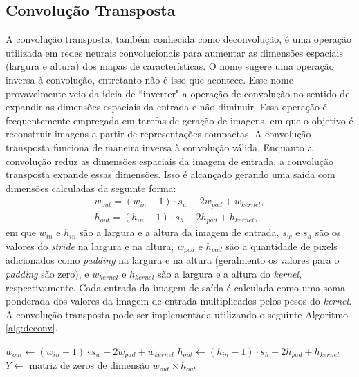 \subsection{Convolução Transposta}
\label{sec:conv_transposta}
A convolução transposta, também conhecida como deconvolução, é uma operação utilizada em redes neurais convolucionais para aumentar as dimensões espaciais (largura e altura) dos mapas de características. O nome sugere uma operação inversa à convolução, entretanto não é isso que acontece. Esse nome provavelmente veio da ideia de ``inverter" a operação de convolução no sentido de expandir as dimensões espaciais da entrada e não diminuir. Essa operação é frequentemente empregada em tarefas de geração de imagens, em que o objetivo é reconstruir imagens a partir de representações compactas. A convolução transposta funciona de maneira inversa à convolução válida. Enquanto a convolução reduz as dimensões espaciais da imagem de entrada, a convolução transposta expande essas dimensões. Isso é alcançado gerando uma saída com dimensões calculadas da seguinte forma:
\begin{equation}
    \begin{split}
    \label{largura_deconv}
    w_{out} = (w_{in} - 1) \cdot s_w - 2w_{pad} + w_{kernel},\\
    h_{out} = (h_{in} - 1) \cdot s_h - 2h_{pad} + h_{kernel},
    \end{split}
\end{equation}
em que $w_{in}$ e $h_{in}$ são a largura e a altura da imagem de entrada, $s_w$ e $s_h$ são os valores do \textit{stride} na largura e na altura, $w_{pad}$ e $h_{pad}$ são a quantidade de pixels adicionados como \textit{padding} na largura e na altura (geralmento os valores para o \textit{padding} são zero), e $w_{kernel}$ e $h_{kernel}$ são a largura e a altura do \textit{kernel}, respectivamente. Cada entrada da imagem de saída é calculada como uma soma ponderada dos valores da imagem de entrada multiplicados pelos pesos do \textit{kernel}. A convolução transposta pode ser implementada utilizando o seguinte Algoritmo \ref{alg:deconv}.
\begin{algorithm}[htpb]
\caption{Convolução Transposta.}
\label{alg:deconv}
$w_{out} \gets (w_{in} - 1) \cdot s_w - 2w_{pad} + w_{kernel}$\;
$h_{out} \gets (h_{in} - 1) \cdot s_h - 2h_{pad} + h_{kernel}$\;
$Y \gets$ matriz de zeros de dimensão $w_{out} \times h_{out}$\;
\end{algorithm}

